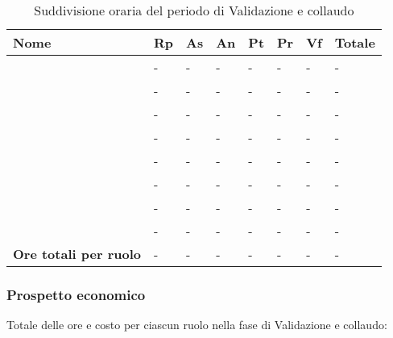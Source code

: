 		\begin{longtable}{ 
			>{\centering}p{} 
			>{\centering}p{}
			>{\centering}p{} 
			>{\centering}p{} 
			>{\centering}p{}
			>{\centering}p{} 
			>{\centering}p{}
			>{\centering\arraybackslash}p{} }
	
			\caption {Suddivisione oraria del periodo di Validazione e collaudo}		\\
			
			\textbf{\color{white}Nome} & 
			\textbf{\color{white}Rp} & 
			\textbf{\color{white}As} & 
			\textbf{\color{white}An} &
			\textbf{\color{white}Pt} &
			\textbf{\color{white}Pr} &
			\textbf{\color{white}Vf} &
			\textbf{\color{white}Totale}
			\tabularnewline  
			\endhead
			
			\VB & - & - & - & - & - & - & - \\
			\LB & - & - & - & - & - & - & - \\
			\NF & - & - & - & - & - & - & - \\
			\EG & - & - & - & - & - & - & - \\
			\FJ & - & - & - & - & - & - & - \\
			\MP & - & - & - & - & - & - & - \\
			\AS & - & - & - & - & - & - & - \\
			\AZ & - & - & - & - & - & - & - \\
			\textbf{Ore totali per ruolo} & - & - & - & - & - & - & - \\
		\end{longtable}
		
	\subsubsection{Prospetto economico}
		Totale delle ore e costo per ciascun ruolo nella fase di Validazione e collaudo:
		
